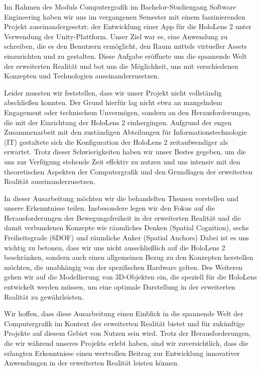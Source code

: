 Im Rahmen des Moduls Computergrafik im Bachelor-Studiengang Software Engineering haben wir uns im vergangenen Semester mit einem faszinierenden Projekt auseinandergesetzt: der Entwicklung einer App für die HoloLens 2 unter Verwendung der Unity-Plattform.
Unser Ziel war es, eine Anwendung zu schreiben, die es den Benutzern ermöglicht, den Raum mittels virtueller Assets einzurichten und zu gestalten.
Diese Aufgabe eröffnete uns die spannende Welt der erweiterten Realität und bot uns die Möglichkeit, uns mit verschiedenen Konzepten und Technologien auseinanderzusetzen.


Leider mussten wir feststellen, dass wir unser Projekt nicht vollständig abschließen konnten.
Der Grund hierfür lag nicht etwa an mangelndem Engagement oder technischem Unvermögen, sondern an den Herausforderungen, die mit der Einrichtung der HoloLens 2 einhergingen.
Aufgrund der engen Zusammenarbeit mit den zuständigen Abteilungen für Informationstechnologie (IT) gestaltete sich die Konfiguration der HoloLens 2 zeitaufwendiger als erwartet.
Trotz dieser Schwierigkeiten haben wir unser Bestes gegeben, um die uns zur Verfügung stehende Zeit effektiv zu nutzen und uns intensiv mit den theoretischen Aspekten der Computergrafik und den Grundlagen der erweiterten Realität auseinanderzusetzen.


In dieser Ausarbeitung möchten wir die behandelten Themen vorstellen und unsere Erkenntnisse teilen.
Insbesondere legen wir den Fokus auf die Herausforderungen der Bewegungsfreiheit in der erweiterten Realität und die damit verbundenen Konzepte wie räumliches Denken (Spatial Cognition), sechs Freiheitsgrade (6DOF) und räumliche Anker (Spatial Anchors)
Dabei ist es uns wichtig zu betonen, dass wir uns nicht ausschließlich auf die HoloLens 2 beschränken, sondern auch einen allgemeinen Bezug zu den Konzepten herstellen möchten, die unabhängig von der spezifischen Hardware gelten.
Des Weiteren gehen wir auf die Modellierung von 3D-Objekten ein, die speziell für die HoloLens entwickelt werden müssen, um eine optimale Darstellung in der erweiterten Realität zu gewährleisten.


Wir hoffen, dass diese Ausarbeitung einen Einblick in die spannende Welt der Computergrafik im Kontext der erweiterten Realität bietet und für zukünftige Projekte auf diesem Gebiet von Nutzen sein wird.
Trotz der Herausforderungen, die wir während unseres Projekts erlebt haben, sind wir zuversichtlich, dass die erlangten Erkenntnisse einen wertvollen Beitrag zur Entwicklung innovativer Anwendungen in der erweiterten Realität leisten können.
